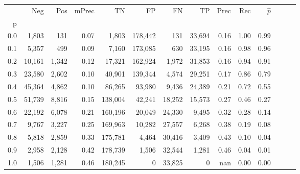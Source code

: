 \begin{tabular}{rrrrrrrrrrrrrr}
\toprule
{} &     Neg &    Pos & mPrec &       TN &       FP &      FN &      TP &  Prec &   Rec & $\hat{p}$ \\
p   &         &        &       &          &          &         &         &       &       &           \\
\midrule
0.0 &   1,803 &    131 &  0.07 &    1,803 &  178,442 &     131 &  33,694 &  0.16 &  1.00 &      0.99 \\
0.1 &   5,357 &    499 &  0.09 &    7,160 &  173,085 &     630 &  33,195 &  0.16 &  0.98 &      0.96 \\
0.2 &  10,161 &  1,342 &  0.12 &   17,321 &  162,924 &   1,972 &  31,853 &  0.16 &  0.94 &      0.91 \\
0.3 &  23,580 &  2,602 &  0.10 &   40,901 &  139,344 &   4,574 &  29,251 &  0.17 &  0.86 &      0.79 \\
0.4 &  45,364 &  4,862 &  0.10 &   86,265 &   93,980 &   9,436 &  24,389 &  0.21 &  0.72 &      0.55 \\
0.5 &  51,739 &  8,816 &  0.15 &  138,004 &   42,241 &  18,252 &  15,573 &  0.27 &  0.46 &      0.27 \\
0.6 &  22,192 &  6,078 &  0.21 &  160,196 &   20,049 &  24,330 &   9,495 &  0.32 &  0.28 &      0.14 \\
0.7 &   9,767 &  3,227 &  0.25 &  169,963 &   10,282 &  27,557 &   6,268 &  0.38 &  0.19 &      0.08 \\
0.8 &   5,818 &  2,859 &  0.33 &  175,781 &    4,464 &  30,416 &   3,409 &  0.43 &  0.10 &      0.04 \\
0.9 &   2,958 &  2,128 &  0.42 &  178,739 &    1,506 &  32,544 &   1,281 &  0.46 &  0.04 &      0.01 \\
1.0 &   1,506 &  1,281 &  0.46 &  180,245 &        0 &  33,825 &       0 &   nan &  0.00 &      0.00 \\
\bottomrule
\end{tabular}
